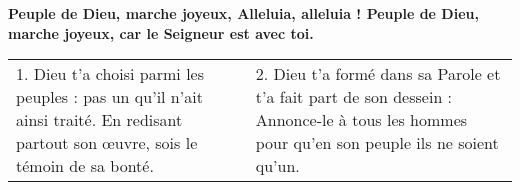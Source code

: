 \textbf{
Peuple de Dieu, marche joyeux, Alleluia, alleluia !
Peuple de Dieu, marche joyeux, car le Seigneur est avec toi.}

\begin{tabular}{p{} p{}}
1. Dieu t’a choisi parmi les peuples : pas un qu’il n’ait ainsi traité.\newline
En redisant partout son œuvre, sois le témoin de sa bonté.
&
2. Dieu t’a formé dans sa Parole et t’a fait part de son dessein :\newline
Annonce-le à tous les hommes pour qu’en son peuple ils ne soient qu’un.
\end{tabular}

